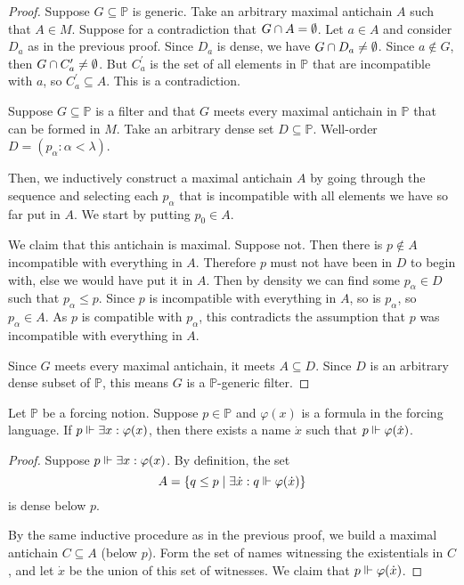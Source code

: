 \documentclass[11pt]{article}
\renewcommand{\P}{\mathbb{P}}
\renewcommand{\phi}{\varphi}
\begin{document}
\begin{proof}
    Suppose $G \subseteq \P$ is generic.
    Take an arbitrary maximal antichain $A$ such that $A \in M$.
    Suppose for a contradiction that $G \cap A = \emptyset$.
    Let $a \in A$ and consider $D_a$ as in the previous proof.
    Since $D_a$ is dense, we have $G \cap D_a \neq \emptyset$.
    Since $a \notin G$, then $G \cap C^\prime_a \neq \emptyset$.
    But $C^\prime_a$ is the set of all elements in $\P$ that are incompatible
    with $a$, so $C^\prime_a \subseteq A$. This is a contradiction.

    Suppose $G \subseteq \P$ is a filter and that $G$ meets every maximal
    antichain in $\P$ that can be formed in $M$.
    Take an arbitrary dense set $D \subseteq \P$.
    Well-order
    $D = (p_\alpha : \alpha < \lambda)$.

    Then, we inductively construct a maximal antichain $A$ by going through the
    sequence and selecting each $p_\alpha$ that is incompatible with all
    elements we have so far put in $A$. We start by putting $p_0 \in A$.

    We claim that this antichain is maximal.
    Suppose not.
    Then there is $p \notin A$ incompatible with everything in $A$.
    Therefore $p$ must not have been in $D$ to begin with, else we would have
    put it in $A$.
    Then by density we can find some $p_\alpha \in D$ such that
    $p_\alpha \leq p$.
    Since $p$ is incompatible with everything in $A$, so is $p_\alpha$,
    so $p_\alpha \in A$.
    As $p$ is compatible with $p_\alpha$, this contradicts the assumption that
    $p$ was incompatible with everything in $A$.

    Since $G$ meets every maximal antichain, it meets $A \subseteq D$.
    Since $D$ is an arbitrary dense subset of $\P$, this means $G$ is a
    $\P$-generic filter.
\end{proof}

\begin{prop}
    Let $\P$ be a forcing notion.
    Suppose $p \in \P$ and $\phi(x)$ is a formula in the forcing language.
    If $p \forces \exists x : \phi(x)$,
    then there exists a name $\dot x$ such that $p \forces \phi(\dot x)$.
\end{prop}

\begin{proof}
    Suppose $p \forces \exists x : \phi(x)$.
    By definition, the set
    \begin{equation*}
        A = \setof{ q \leq p \sth \exists \dot x : q \forces \phi(\dot x) }
    \end{equation*}
    is dense below $p$.

    By the same inductive procedure as in the previous proof, we build a
    maximal antichain $C \subseteq A$ (below $p$).
    Form the set of names witnessing the existentials in $C$,
    and let $\dot x$ be the union of this set of witnesses.
    We claim that $p \forces \phi(\dot x)$.
\end{proof}
\end{document}
